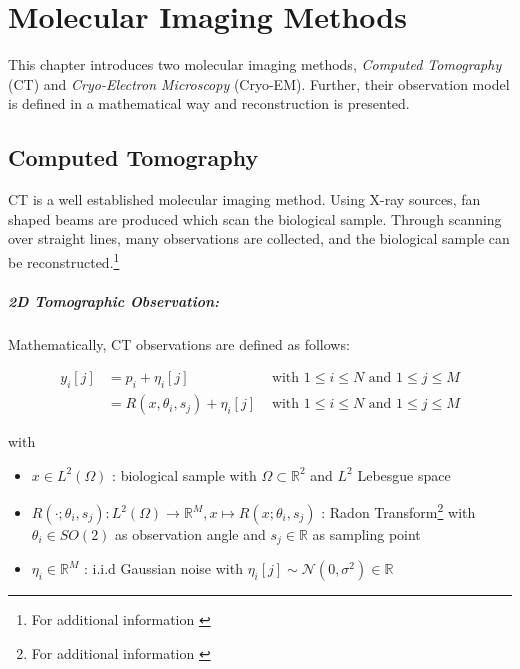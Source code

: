 \chapter{Molecular Imaging Methods}
\label{sec:imaging}

This chapter introduces two molecular imaging methods, \textit{Computed Tomography} (CT) and 
\textit{Cryo-Electron Microscopy} (Cryo-EM). 
Further, their observation model is defined in a mathematical way and reconstruction is presented.




\section{Computed Tomography}
CT is a well established molecular imaging method.
Using X-ray sources, fan shaped beams are produced which scan the biological sample.
Through scanning over straight lines, many observations are collected, 
and the biological sample can be reconstructed.\footnote{For additional information \cite{computedTomography}}

\paragraph{2D Tomographic Observation:}

Mathematically, CT observations are defined as follows:

\begin{equation}
    \label{eq:2Dreconstruction}
    \begin{aligned}
        y_i[j] &= p_i + \eta_i[j] & \text{ with } 1 \leq i \leq N \text{ and } 1 \leq j \leq M \\
               &= R(x, \theta_i, s_j) + \eta_i[j] & \text{ with } 1 \leq i \leq N \text{ and } 1 \leq j \leq M
    \end{aligned}
\end{equation}

with
\begin{itemize}
    \item $x \in L^2(\Omega)$ : biological sample with $\Omega \subset \mathbb{R}^2 $ and $L^2$ Lebesgue space
    \item $R(\cdot; \theta_i, s_j): L^2(\Omega) \to \mathbb{R}^M , x \mapsto R(x; \theta_i, s_j)$ : Radon Transform\footnote{For additional information \cite{radonTransform}} 
        with $\theta_i \in SO(2)$ as observation angle and $s_j \in \mathbb{R}$ as sampling point
    \item $\eta_i \in \mathbb{R}^M$ : i.i.d Gaussian noise with $\eta_i[j] \sim \mathcal{N}(0,\sigma^2) \in \mathbb{R}$
\end{itemize}


